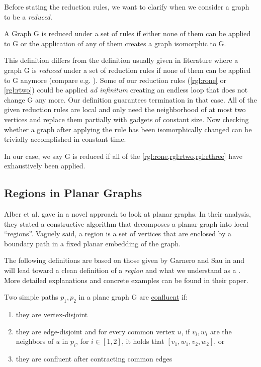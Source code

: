 Before stating the reduction rules, we want to clarify when we consider a graph to be a \textit{reduced}. 

\begin{definition}\label{def:reduced}
    A Graph G is reduced under a set of rules if either none of them can be applied to G or the application of any of them creates a graph isomorphic to G.
\end{definition}

This definition differs from the definition usually given in literature where a graph G is \textit{reduced} under a set of reduction rules if none of them can be applied to G anymore (compare e.g. \cite{Fomin2019}). Some of our reduction rules (\cref{rgl:rone} or \cref{rgl:rtwo}) could be applied \textit{ad infinitum} creating an endless loop that does not change G any more. Our definition guarantees termination in that case. All of the given reduction rules are local and only need the neighborhood of at most two vertices and replace them partially with gadgets of constant size. Now checking whether a graph after applying the rule has been isomorphically changed can be trivially accomplished in constant time.

In our case, we say G is reduced if all of the \cref{rgl:rone,rgl:rtwo,rgl:rthree} have exhaustively been applied.

\subsection{Regions in Planar Graphs}

Alber et al. gave in \cite{Alber2004} a novel approach to look at planar graphs. In their analysis, they stated a constructive algorithm that decomposes a planar graph into local ``regions''. Vaguely said, a region is a set of vertices that are enclosed by a boundary path in a fixed planar embedding of the graph.

The following definitions are based on those given by Garnero and Sau in \cite[Revision 2014]{Garnero2018} and will lead toward a clean definition of a \textit{region} and what we understand as a \dreg. More detailed explanations and concrete examples can be found in their paper.

\begin{definition}
    Two simple paths $p_1, p_2$ in a plane graph G are \underline{confluent} if:
    
    \begin{enumerate}
        \item they are vertex-disjoint
        \item they are edge-disjoint and for every common vertex $u$, if $v_i, w_i$ are the neighbors of $u$ in $p_i$, for $i \in [1,2]$, it holds that $[v_1, w_1, v_2, w_2]$, or
        \item they are confluent after contracting common edges
    \end{enumerate}
\end{definition}


